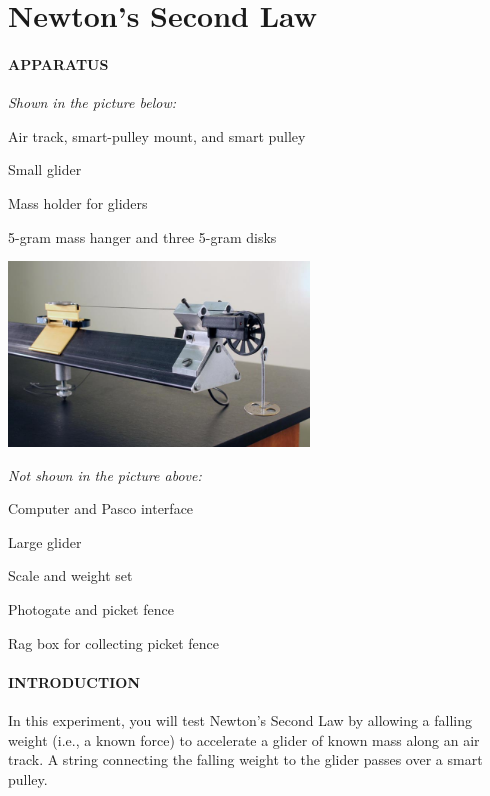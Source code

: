 
\vspace{-5ex}\part*{Newton's Second Law}

\subsection*{APPARATUS}

\noindent\textit{Shown in the picture below:}
\squishlist
\item Air track, smart-pulley mount, and smart pulley
\item Small glider
\item Mass holder for gliders
\item 5-gram mass hanger and three 5-gram disks
\squishend
\begin{center} \includegraphics*[width=0.6\textwidth]{imgs/6labs/6Alab/6Aexp3/IMG_5514_web.jpg} \end{center}
\noindent\textit{Not shown in the picture above:}
\squishlist
\item Computer and Pasco interface
\item Large glider
\item Scale and weight set
\item Photogate and picket fence
\item Rag box for collecting picket fence
\squishend

\subsection*{INTRODUCTION}

In this experiment, you will test Newton's Second Law by allowing a falling weight (i.e., a known force) to accelerate a glider of known mass along an air track.  A string connecting the falling weight to the glider passes over a smart pulley.

